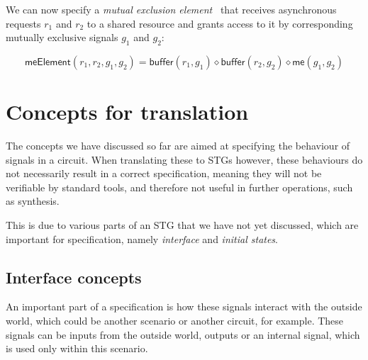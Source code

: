\documentclass[british, journal]{IEEEtran}
\begin{document}
We can now specify a \emph{mutual exclusion
element}~\cite{2008_kinniment_synchronisation}
that receives asynchronous requests $r_{1}$ and $r_{2}$ to a shared
resource and grants access to it by corresponding mutually exclusive
signals $g_{1}$ and $g_{2}$:

\vspace{-3mm}
{\small
\[
\mathsf{meElement}(r_{1}, r_{2}, g_{1}, g_{2})\!=\!\mathsf{buffer}(r_{1}, g_{1})
\diamond \mathsf{buffer}(r_{2}, g_{2}) \diamond \mathsf{me}(g_{1}, g_{2})
\]}
\vspace{-3mm}

\section{Concepts for translation\label{sec:trans-concepts}}

The concepts we have discussed so far are aimed at specifying the behaviour of signals in a circuit.
When translating these to STGs however, these behaviours do not necessarily result in a correct
specification, meaning they will not be verifiable by standard tools, and therefore not useful in 
further operations, such as synthesis.

This is due to various parts of an STG that we have not yet discussed, which are important
for specification, namely \emph{interface} and \emph{initial states}.

\subsection{Interface concepts \label{sub:interface}} 

An important part of a specification is how these signals interact with the outside world, which could
be another scenario or another circuit, for example. These signals can be inputs from the outside world,
outputs or an internal signal, which is used only within this scenario. 
\end{document}
